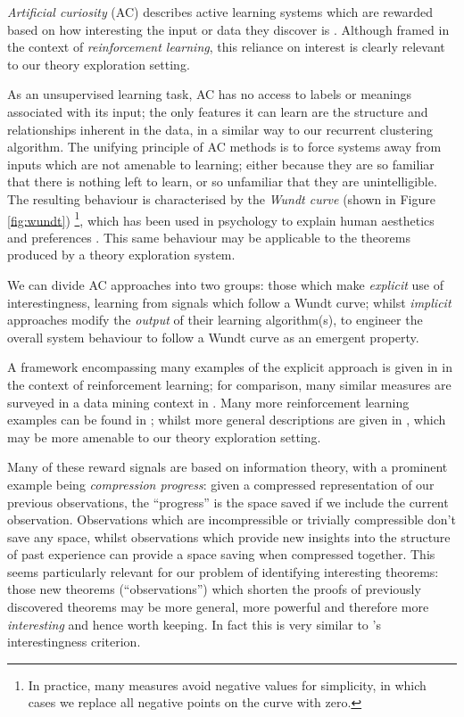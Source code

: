 \emph{Artificial curiosity} (AC) describes active learning systems which are
rewarded based on how interesting the input or data they discover is
\cite{schmidhuber2006developmental}. Although framed in the context of
\emph{reinforcement learning}, this reliance on interest is clearly relevant to
our theory exploration setting.

As an unsupervised learning task, AC has no access to labels or meanings
associated with its input; the only features it can learn are the structure and
relationships inherent in the data, in a similar way to our recurrent clustering
algorithm. The unifying principle of AC methods is to force systems away from
inputs which are not amenable to learning; either because they are so familiar
that there is nothing left to learn, or so unfamiliar that they are
unintelligible. The resulting behaviour is characterised by the \emph{Wundt
  curve} (shown in Figure \ref{fig:wundt}) \footnote{In practice, many measures
  avoid negative values for simplicity, in which cases we replace all negative
  points on the curve with zero.}, which has been used in psychology to explain
human aesthetics and preferences \cite{berlyne1970novelty}. This same behaviour
may be applicable to the theorems produced by a theory exploration system.

We can divide AC approaches into two groups: those which make \emph{explicit}
use of interestingness, learning from signals which follow a Wundt curve; whilst
\emph{implicit} approaches modify the \emph{output} of their learning
algorithm(s), to engineer the overall system behaviour to follow a Wundt curve
as an emergent property.

A framework encompassing many examples of the explicit approach is given in
\cite{oudeyer2007intrinsic} in the context of reinforcement learning; for
comparison, many similar measures are surveyed in a data mining context in
\cite{geng2006interestingness}. Many more reinforcement learning examples can
be found in \cite{Kaplan2006, Lipson2007, Luciw2011, Macedo2000,
  Ramik.Sabourin.Madani:2013, Roa.Kruijff.Jacobsson:2009, Schmidhuber:1991,
  oudeyer2004intelligent}; whilst more general descriptions are given in
\cite{Schaul.Sun.Wierstra.ea:2011, Scott1989, maher2008achieving}, which may be
more amenable to our theory exploration setting.

Many of these reward signals are based on information theory, with a prominent
example being \emph{compression progress}: given a compressed representation of
our previous observations, the ``progress'' is the space saved if we include the
current observation. Observations which are incompressible or trivially
compressible don't save any space, whilst observations which provide new
insights into the structure of past experience can provide a space saving when
compressed together. This seems particularly relevant for our problem of
identifying interesting theorems: those new theorems (``observations'') which
shorten the proofs of previously discovered theorems may be more general, more
powerful and therefore more \emph{interesting} and hence worth keeping. In fact
this is very similar to \quickspec{}'s interestingness criterion.

